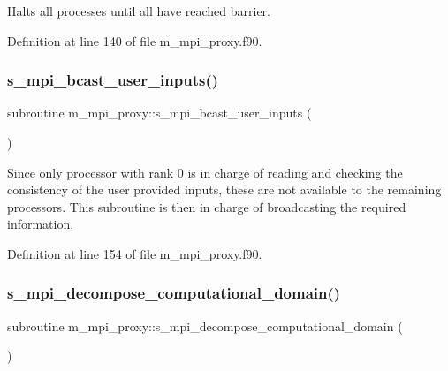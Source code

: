 Halts all processes until all have reached barrier. 



Definition at line 140 of file m\+\_\+mpi\+\_\+proxy.\+f90.

\mbox{\label{namespacem__mpi__proxy_a69660c5fe9302a8c0496b622fa3b5286}} 
\subsubsection{\texorpdfstring{s\+\_\+mpi\+\_\+bcast\+\_\+user\+\_\+inputs()}{s\_mpi\_bcast\_user\_inputs()}}
{\footnotesize\ttfamily subroutine m\+\_\+mpi\+\_\+proxy\+::s\+\_\+mpi\+\_\+bcast\+\_\+user\+\_\+inputs (\begin{DoxyParamCaption}{ }\end{DoxyParamCaption})}



Since only processor with rank 0 is in charge of reading and checking the consistency of the user provided inputs, these are not available to the remaining processors. This subroutine is then in charge of broadcasting the required information. 



Definition at line 154 of file m\+\_\+mpi\+\_\+proxy.\+f90.

\mbox{\label{namespacem__mpi__proxy_a80c5e235786545276fe6ffa06965017f}} 
\subsubsection{\texorpdfstring{s\+\_\+mpi\+\_\+decompose\+\_\+computational\+\_\+domain()}{s\_mpi\_decompose\_computational\_domain()}}
{\footnotesize\ttfamily subroutine m\+\_\+mpi\+\_\+proxy\+::s\+\_\+mpi\+\_\+decompose\+\_\+computational\+\_\+domain (\begin{DoxyParamCaption}{ }\end{DoxyParamCaption})}



